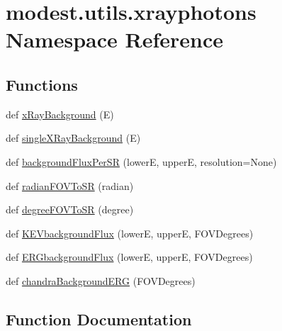 \hypertarget{namespacemodest_1_1utils_1_1xrayphotons}{}\section{modest.\+utils.\+xrayphotons Namespace Reference}
\label{namespacemodest_1_1utils_1_1xrayphotons}
\subsection*{Functions}
\begin{DoxyCompactItemize}
\item 
def \hyperlink{namespacemodest_1_1utils_1_1xrayphotons_ac25c6bed12492c96f5bec1a5999e5d72}{x\+Ray\+Background} (E)
\item 
def \hyperlink{namespacemodest_1_1utils_1_1xrayphotons_a90c09e1d9d684bbc29fbb2d899a3e365}{single\+X\+Ray\+Background} (E)
\item 
def \hyperlink{namespacemodest_1_1utils_1_1xrayphotons_a4b4d74ca9d380f56595d8d5b1bb79f36}{background\+Flux\+Per\+SR} (lowerE, upperE, resolution=None)
\item 
def \hyperlink{namespacemodest_1_1utils_1_1xrayphotons_a3b81edfe248218f10f5e396c63ad0486}{radian\+F\+O\+V\+To\+SR} (radian)
\item 
def \hyperlink{namespacemodest_1_1utils_1_1xrayphotons_a97521aadc03c97ce954a246bcff20241}{degree\+F\+O\+V\+To\+SR} (degree)
\item 
def \hyperlink{namespacemodest_1_1utils_1_1xrayphotons_ad099f7b30fa16ed78149c6cf3b6e2046}{K\+E\+Vbackground\+Flux} (lowerE, upperE, F\+O\+V\+Degrees)
\item 
def \hyperlink{namespacemodest_1_1utils_1_1xrayphotons_a6a2dd2f334288f742ec7b0f731daec5e}{E\+R\+Gbackground\+Flux} (lowerE, upperE, F\+O\+V\+Degrees)
\item 
def \hyperlink{namespacemodest_1_1utils_1_1xrayphotons_a33db55f287f22c04d6acd0107102ab42}{chandra\+Background\+E\+RG} (F\+O\+V\+Degrees)
\end{DoxyCompactItemize}


\subsection{Function Documentation}
